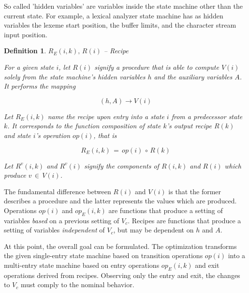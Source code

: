 \documentclass[12pt,a4paper]{scrartcl}
\newtheorem{definition}{Definition}
\begin{document}
So called 'hidden variables' are variables inside the state machine other than
the current state.  For example, a lexical analyzer state machine has as hidden
variables the lexeme start position, the buffer limits, and the character
stream input position.

\begin{definition} $R_E(i,k),\,R(i)$ -- Recipe 

For a given state $i$, let $R(i)$ signify a procedure that is able to compute
$V(i)$ solely from the state machine's hidden variables $h$ and the auxiliary
variables $A$.  It performs the mapping

\begin{equation} \label{eq:recipe-procedure}
    (h, A) \rightarrow V(i)                                             
\end{equation}

Let $R_E(i,k)$ name the recipe upon entry into a state $i$ from a predecessor
state $k$. It corresponds to the \textit{function composition} of state $k$'s
output recipe $R(k)$ and state $i$'s operation $op(i)$, that is

\begin{equation} \label{eq:entry-recipe-concatenated}
    R_E(i,k) \,=\, op(i)\, \circ \, R(k)
\end{equation}

Let $R^v(i,k)$ and $R^v(i)$ signify the components of $R(i,k)$ and $R(i)$ which
produce $v\,\in\,V(i)$.  

\end{definition}

The fundamental difference between $R(i)$ and $V(i)$ is that the former
describes a procedure and the latter represents the values which are produced.
Operations $op(i)$ and $op_E(i,k)$ are functions that produce a setting of
variables \textit{based} on a previous setting of $V_c$.  Recipes are functions
that produce a setting of variables \textit{independent} of $V_c$, but may be
dependent on $h$ and $A$.

At this point, the overall goal can be formulated. The optimization transforms
the given single-entry state machine based on transition operations $op(i)$
into a multi-entry state machine based on entry operations $op_E(i,k)$ and exit
operations derived from recipes. Observing only the entry and exit, the changes
to $V_c$ must comply to the nominal behavior. 

%
\end{document}

